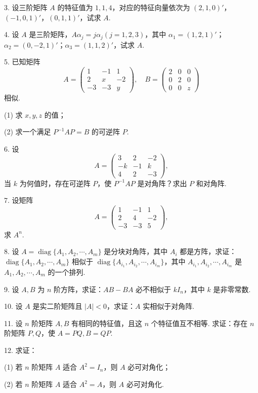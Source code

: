 \documentclass[UTF8, 12pt, fontset=fandol, oneside]{ctexart}
\begin{document}
3. 设三阶矩阵 $A$ 的特征值为 $1,1,4$，对应的特征向量依次为 $(2,1,0)'$，$(-1,0,1)'$，$(0,1,1)'$，试求 $A$.

4. 设 $A$ 是三阶矩阵，$A\alpha_j=j\alpha_j(j=1,2,3)$，其中 $\alpha_1=(1,2,1)'$；$\alpha_2=(0,-2,1)'$；$\alpha_3=(1,1,2)'$，试求 $A$.

5. 已知矩阵
\[
A=\left(\begin{array}{ccc}
1 & -1 & 1\\
2 & x & -2\\
-3 & -3 & y
\end{array}\right),\quad
B=\left(\begin{array}{ccc}
2 & 0 & 0\\
0 & 2 & 0\\
0 & 0 & z
\end{array}\right)
\]
相似.

(1) 求 $x,y,z$ 的值；

(2) 求一个满足 $P^{-1}AP=B$ 的可逆阵 $P$.

6. 设
\[
A=\left(\begin{array}{ccc}
3 & 2 & -2\\
-k & -1 & k\\
4 & 2 & -3
\end{array}\right),
\]
当 $k$ 为何值时，存在可逆阵 $P$，使 $P^{-1}AP$ 是对角阵？求出 $P$ 和对角阵.

7. 设矩阵
\[
A=\left(\begin{array}{ccc}
1 & -1 & 1\\
2 & 4 & -2\\
-3 & -3 & 5
\end{array}\right),
\]
求 $A^n$.

8. 设 $A=\operatorname{diag}\{A_1,A_2,\cdots,A_m\}$ 是分块对角阵，其中 $A_i$ 都是方阵，求证：$\operatorname{diag}\{A_1,A_2,\cdots,A_m\}$ 相似于 $\operatorname{diag}\{A_{i_1},A_{i_2},\cdots,A_{i_m}\}$，其中 $A_{i_1},A_{i_2},\cdots,A_{i_m}$ 是 $A_1,A_2,\cdots,A_m$ 的一个排列.

9. 设 $A,B$ 为 $n$ 阶方阵，求证：$AB-BA$ 必不相似于 $kI_n$，其中 $k$ 是非零常数.

10. 设 $A$ 是实二阶矩阵且 $|A|<0$，求证：$A$ 实相似于对角阵.

11. 设 $n$ 阶矩阵 $A,B$ 有相同的特征值，且这 $n$ 个特征值互不相等. 求证：存在 $n$ 阶矩阵 $P,Q$，使 $A=PQ,B=QP$.

12. 求证：

(1) 若 $n$ 阶矩阵 $A$ 适合 $A^2=I_n$，则 $A$ 必可对角化；

(2) 若 $n$ 阶矩阵 $A$ 适合 $A^2=A$，则 $A$ 必可对角化.
\end{document}
